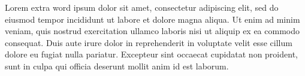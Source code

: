 Lorem extra word ipsum dolor sit amet, consectetur adipiscing elit, sed do eiusmod tempor incididunt ut labore et dolore
 magna aliqua. Ut enim ad minim veniam, quis nostrud exercitation ullamco laboris nisi ut aliquip ex ea commodo 
consequat. Duis aute irure dolor in reprehenderit in voluptate velit esse cillum dolore eu fugiat nulla pariatur. 
Excepteur sint occaecat cupidatat non proident, sunt in culpa qui officia deserunt mollit anim id est laborum.
